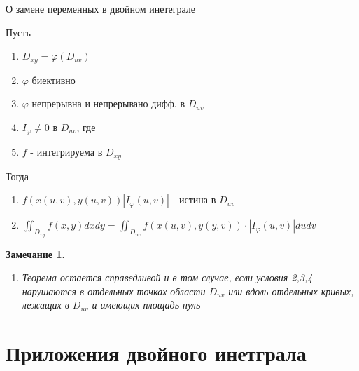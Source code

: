 \documentclass[a4paper, 14pt]{report}
\newtheorem{note}{Замечание}[chapter]
\begin{document}
    \begin{theorem}
        О замене переменных в двойном инетеграле

        Пусть

        \begin{enumerate}
            \item $D_{xy} = \varphi(D_{uv})$
            \item $\varphi$ биективно
            \item $\varphi$ непрерывна и непрерывано дифф. в $D_{uv}$
            \item $I_\varphi \ne 0$ в $D_{uv}$, где 
            \item $f$ - интегрируема в $D_{xy}$
        \end{enumerate}
        
        Тогда

        \begin{enumerate}
            \item $f(x(u,v), y(u,v)) |I_\varphi (u,v)|$ - истина в $D_{uv}$
            \item $\iint_{D_{xy}} f(x,y) dxdy = \iint_{D_{uv}} f(x(u,v), y(y,v)) \cdot |I_\varphi (u,v)| dudv$
        \end{enumerate}
    \end{theorem}

    \begin{note}
        \begin{enumerate}
            \item Теорема остается справедливой и в том случае, если условия 2,3,4 нарушаются в отдельных точках области $D_{uv}$ или вдоль отдельных кривых, лежащих в $D_{uv}$ и имеющих площадь нуль
        \end{enumerate}
    \end{note}

    \section{Приложения двойного инетграла}
\end{document}
